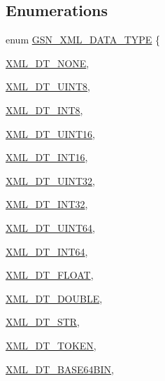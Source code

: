 \subsection*{Enumerations}
\begin{DoxyCompactItemize}
\item 
enum \hyperlink{a00679_ga0ed9af8f445f8406f6a0a2a84e40eb81}{GSN\_\-XML\_\-DATA\_\-TYPE} \{ \par
\hyperlink{a00679_gga0ed9af8f445f8406f6a0a2a84e40eb81afc9b8ccb7858d607cd53d3e41145e32b}{XML\_\-DT\_\-NONE}, 
\par
\hyperlink{a00679_gga0ed9af8f445f8406f6a0a2a84e40eb81a60e3e47677a1dd025834628166ccfb24}{XML\_\-DT\_\-UINT8}, 
\par
\hyperlink{a00679_gga0ed9af8f445f8406f6a0a2a84e40eb81a82d517683d4a958cfcd302a597a82e67}{XML\_\-DT\_\-INT8}, 
\par
\hyperlink{a00679_gga0ed9af8f445f8406f6a0a2a84e40eb81a89cb1abbe0ec9c682632214fa5a7df9e}{XML\_\-DT\_\-UINT16}, 
\par
\hyperlink{a00679_gga0ed9af8f445f8406f6a0a2a84e40eb81a5427e90384a785eb7815463e9d1d991b}{XML\_\-DT\_\-INT16}, 
\par
\hyperlink{a00679_gga0ed9af8f445f8406f6a0a2a84e40eb81a9f52a5bb732ae4a44d6c6a846b69f1ef}{XML\_\-DT\_\-UINT32}, 
\par
\hyperlink{a00679_gga0ed9af8f445f8406f6a0a2a84e40eb81a6b68de8e8a34b7b10685b55447ded0ce}{XML\_\-DT\_\-INT32}, 
\par
\hyperlink{a00679_gga0ed9af8f445f8406f6a0a2a84e40eb81abc67dfacd76d8cee6a8d31d715a0bcbc}{XML\_\-DT\_\-UINT64}, 
\par
\hyperlink{a00679_gga0ed9af8f445f8406f6a0a2a84e40eb81a9cc3700c840532a660a7e0d5b0a86761}{XML\_\-DT\_\-INT64}, 
\par
\hyperlink{a00679_gga0ed9af8f445f8406f6a0a2a84e40eb81aa965dba205752a07f8681207e697a402}{XML\_\-DT\_\-FLOAT}, 
\par
\hyperlink{a00679_gga0ed9af8f445f8406f6a0a2a84e40eb81acd1dc0c36bd9f15a092c3361e3b57887}{XML\_\-DT\_\-DOUBLE}, 
\par
\hyperlink{a00679_gga0ed9af8f445f8406f6a0a2a84e40eb81ad40e2d5e29871b4108b77dba152d8ee6}{XML\_\-DT\_\-STR}, 
\par
\hyperlink{a00679_gga0ed9af8f445f8406f6a0a2a84e40eb81aca534cfe240273ec8435e79a461c372f}{XML\_\-DT\_\-TOKEN}, 
\par
\hyperlink{a00679_gga0ed9af8f445f8406f6a0a2a84e40eb81aa423e45d9e655512957c45e84164fdf3}{XML\_\-DT\_\-BASE64BIN}, 
\par

\end{DoxyCompactItemize}
